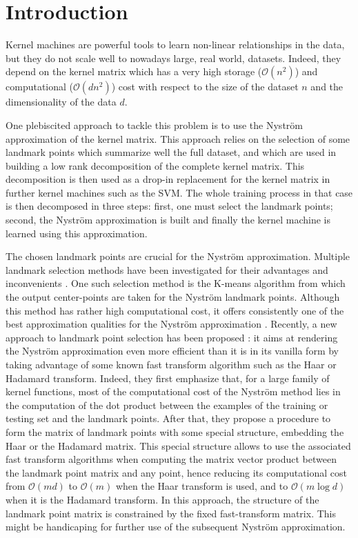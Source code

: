 \section{Introduction}

Kernel machines are powerful tools to learn non-linear relationships in the data, but they do not scale well to nowadays large, real world, datasets. Indeed, they depend on the kernel matrix which has a very high storage ($\mathcal{O}(n^2)$) and computational ($\mathcal{O}(dn^2)$) cost with respect to the size of the dataset $n$ and the dimensionality of the data $d$.

One plebiscited approach to tackle this problem is to use the Nyström approximation of the kernel matrix. This approach relies on the selection of some landmark points which summarize well the full dataset, and which are used in building a low rank decomposition of the complete kernel matrix. This decomposition is then used as a drop-in replacement for the kernel matrix in further kernel machines such as the SVM. The whole training process in that case is then decomposed in three steps: first, one must select the landmark points; second, the Nyström approximation is built and finally the kernel machine is learned using this approximation. 

The chosen landmark points are crucial for the Nyström approximation. Multiple landmark selection methods have been investigated for their advantages and inconvenients \cite{kumar2012sampling}\cite{musco2017recursive}. One such selection method is the K-means algorithm from which the output center-points are taken for the Nyström landmark points. Although this method has rather high computational cost, it offers consistently one of the best approximation qualities for the Nyström approximation \cite{kumar2012sampling}. Recently, a new approach to landmark point selection has been proposed \cite{si2016computationally}: it aims at rendering the Nyström approximation even more efficient than it is in its vanilla form by taking advantage of some known fast transform algorithm such as the Haar or Hadamard transform. Indeed, they first emphasize that, for a large family of kernel functions, most of the computational cost of the Nyström method lies in the computation of the dot product between the examples of the training or testing set and the landmark points. After that, they propose a procedure to form the matrix of landmark points with some special structure, embedding the Haar or the Hadamard matrix. This special structure allows to use the associated fast transform algorithms when computing the matrix vector product between the landmark point matrix and any point, hence reducing its computational cost from $\mathcal{O}(md)$ to $\mathcal{O}(m)$ when the Haar transform is used, and to $\mathcal{O}(m \log d)$ when it is the Hadamard transform. In this approach, the structure of the landmark point matrix is constrained by the fixed fast-transform matrix. This might be handicaping for further use of the subsequent Nyström approximation.

